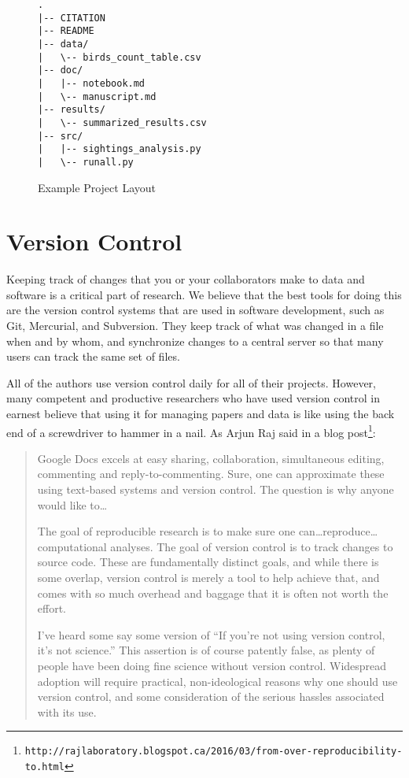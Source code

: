 \documentclass[10pt]{article}
\newcommand{\withurl}[2]{{#1}\footnote{\texttt{#2}}}
\begin{document}
\begin{figure}
\begin{verbatim}
.
|-- CITATION
|-- README
|-- data/
|   \-- birds_count_table.csv
|-- doc/
|   |-- notebook.md
|   \-- manuscript.md
|-- results/
|   \-- summarized_results.csv
|-- src/
|   |-- sightings_analysis.py
|   \-- runall.py
\end{verbatim}
\caption{Example Project Layout}
\label{fig:layout}
\end{figure}

\section{Version Control}\label{sec:versioning}

Keeping track of changes that you or your collaborators make to data
and software is a critical part of research.  We believe that the best
tools for doing this are the version control systems that are used in
software development, such as Git, Mercurial, and Subversion.  They
keep track of what was changed in a file when and by whom, and
synchronize changes to a central server so that many users can track
the same set of files.

All of the authors use version control daily for all of their
projects.  However, many competent and productive researchers who have
used version control in earnest believe that using it for managing
papers and data is like using the back end of a screwdriver to hammer
in a nail.  As Arjun Raj said in \withurl{a blog
  post}{http://rajlaboratory.blogspot.ca/2016/03/from-over-reproducibility-to.html}:

\begin{quote}
Google Docs excels at easy sharing, collaboration, simultaneous
editing, commenting and reply-to-commenting. Sure, one can approximate
these using text-based systems and version control. The question is
why anyone would like to{\ldots}

The goal of reproducible research is to make sure one
can{\dots}reproduce{\ldots}computational analyses. The goal of version
control is to track changes to source code. These are fundamentally
distinct goals, and while there is some overlap, version control is
merely a tool to help achieve that, and comes with so much overhead
and baggage that it is often not worth the effort.

I've heard some say some version of ``If you're not using version
control, it's not science.'' This assertion is of course patently
false, as plenty of people have been doing fine science without
version control. Widespread adoption will require practical,
non-ideological reasons why one should use version control, and some
consideration of the serious hassles associated with its use.
\end{quote}
\end{document}
